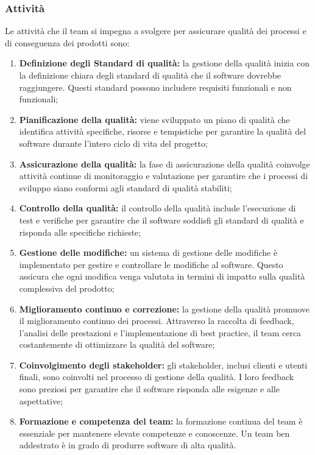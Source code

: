 \subsubsection{Attività}
Le attività che il team si impegna a svolgere per assicurare qualità dei processi e di conseguenza dei prodotti sono:
\begin{enumerate}
    \item \textbf{Definizione degli Standard di qualità:}
        la gestione della qualità inizia con la definizione chiara degli standard di qualità che il software dovrebbe raggiungere. Questi standard possono includere requisiti funzionali e non funzionali;

    \item \textbf{Pianificazione della qualità:}
        viene sviluppato un piano di qualità che identifica attività specifiche, risorse e tempistiche per garantire la qualità del software durante l'intero ciclo di vita del progetto;

    \item \textbf{Assicurazione della qualità:}
        la fase di assicurazione della qualità coinvolge attività continue di monitoraggio e valutazione per garantire che i processi di sviluppo siano conformi agli standard di qualità stabiliti;

    \item \textbf{Controllo della qualità:}
        il controllo della qualità include l'esecuzione di test e verifiche per garantire che il software soddisfi gli standard di qualità e risponda alle specifiche richieste;

    \item \textbf{Gestione delle modifiche:}
        un sistema di gestione delle modifiche è implementato per gestire e controllare le modifiche al software. Questo assicura che ogni modifica venga valutata in termini di impatto sulla qualità complessiva del prodotto;

    \item \textbf{Miglioramento continuo e correzione:}
        la gestione della qualità promuove il miglioramento continuo dei processi. Attraverso la raccolta di feedback, l'analisi delle prestazioni e l'implementazione di best practice, il team cerca costantemente di ottimizzare la qualità del software;

    \item \textbf{Coinvolgimento degli stakeholder:}
        gli stakeholder, inclusi clienti e utenti finali, sono coinvolti nel processo di gestione della qualità. I loro feedback sono preziosi per garantire che il software risponda alle esigenze e alle aspettative;

    \item \textbf{Formazione e competenza del team:}
        la formazione continua del team è essenziale per mantenere elevate competenze e conoscenze. Un team ben addestrato è in grado di produrre software di alta qualità.
\end{enumerate}

